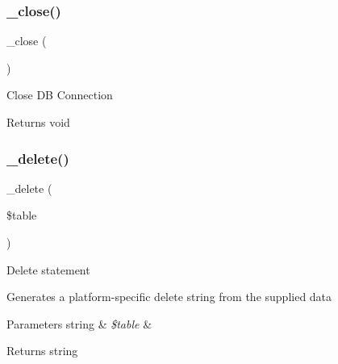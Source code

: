 \subsubsection{\texorpdfstring{\+\_\+close()}{\_close()}}
{\footnotesize\ttfamily \+\_\+close (\begin{DoxyParamCaption}{ }\end{DoxyParamCaption})\hspace{0.3cm}{\ttfamily [protected]}}

Close DB Connection

\begin{DoxyReturn}{Returns}
void 
\end{DoxyReturn}
\mbox{\label{class_c_i___d_b__postgre__driver_a133ea8446ded52589bd22cc9163d0896}} 
\subsubsection{\texorpdfstring{\+\_\+delete()}{\_delete()}}
{\footnotesize\ttfamily \+\_\+delete (\begin{DoxyParamCaption}\item[{}]{\$table }\end{DoxyParamCaption})\hspace{0.3cm}{\ttfamily [protected]}}

Delete statement

Generates a platform-\/specific delete string from the supplied data


\begin{DoxyParams}[1]{Parameters}
string & {\em \$table} & \\
\hline
\end{DoxyParams}
\begin{DoxyReturn}{Returns}
string 
\end{DoxyReturn}
\mbox{\label{class_c_i___d_b__postgre__driver_af8ef0237bfcdb19215b63fff769e7a55}} 
